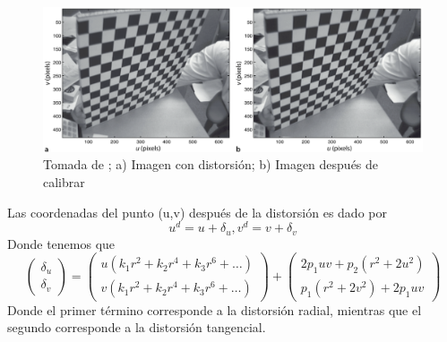 \begin{figure}[h]
	\begin{center}
		\includegraphics[width=0.95 \textwidth]{Contenido/Cuerpo/Capitulo2/Fig20.eps}
		\caption{Tomada de \cite{Book:Corke2011}; a) Imagen con distorsión; b) Imagen después de calibrar}
		\label{fig:20}
	\end{center}
\end{figure}

Las coordenadas del punto (u,v) después de la distorsión es dado por
\begin{equation}
	u^d = u + \delta_u, v^d = v+\delta_v
\end{equation}
Donde tenemos que
\begin{equation}
	\left(
	\begin{array}{c}
			\delta_u \\
			\delta_v
		\end{array}
	\right)
	=
	\left(
	\begin{array}{c}
			u(k_1r^2 + k_2r^4 + k_3r^6 + \dots) \\
			v(k_1r^2 + k_2r^4 + k_3r^6 + \dots)
		\end{array}
	\right)
	+
	\left(
	\begin{array}{c}
			2p_1uv + p_2(r^2+2u^2) \\
			p_1(r^2+2v^2) + 2p_1uv
		\end{array}
	\right)
\end{equation}
Donde el primer término corresponde a la distorsión radial, mientras que el segundo corresponde a la distorsión tangencial.

